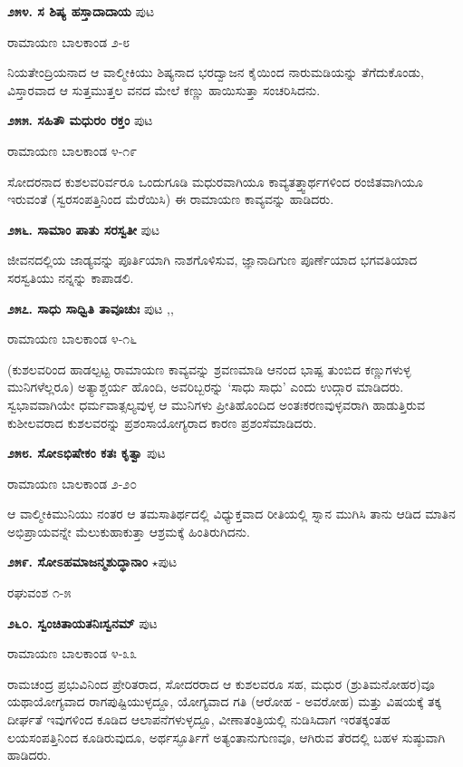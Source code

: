 {\medskip
\noindent\textbf{೨೫೪. ಸ ಶಿಷ್ಯ ಹಸ್ತಾದಾದಾಯ} \hfill ಪುಟ \pageref{198}

\hfill ರಾಮಾಯಣ ಬಾಲಕಾಂಡ ೨-೮

ನಿಯತೇಂದ್ರಿಯನಾದ ಆ ವಾಲ್ಮೀಕಿಯು ಶಿಷ್ಯನಾದ ಭರದ್ವಾಜನ ಕೈಯಿಂದ ನಾರುಮಡಿಯನ್ನು ತೆಗೆದುಕೊಂಡು, ವಿಸ್ತಾರವಾದ ಆ ಸುತ್ತಮುತ್ತಲ ವನದ ಮೇಲೆ ಕಣ್ಣು ಹಾಯಿಸುತ್ತಾ ಸಂಚರಿಸಿದನು.

\medskip
\noindent\textbf{೨೫೫. ಸಹಿತೌ ಮಧುರಂ ರಕ್ತಂ} \hfill ಪುಟ \pageref{189}

\hfill ರಾಮಾಯಣ ಬಾಲಕಾಂಡ ೪-೧೯

ಸೋದರನಾದ ಕುಶಲವರಿರ್ವರೂ ಒಂದುಗೂಡಿ ಮಧುರವಾಗಿಯೂ ಕಾವ್ಯತತ್ತ್ವಾರ್ಥಗಳಿಂದ ರಂಜಿತವಾಗಿಯೂ ಇರುವಂತೆ (ಸ್ವರಸಂಪತ್ತಿನಿಂದ ಮೆರೆಯಿಸಿ) ಈ ರಾಮಾಯಣ ಕಾವ್ಯವನ್ನು ಹಾಡಿದರು.

\medskip
\noindent\textbf{೨೫೬. ಸಾಮಾಂ ಪಾತು ಸರಸ್ವತೀ} \hfill ಪುಟ \pageref{100}

\hfill ಜೀವನದಲ್ಲಿಯ ಜಾಡ್ಯವನ್ನು ಪೂರ್ತಿಯಾಗಿ ನಾಶಗೊಳಿಸುವ, ಜ್ಞಾನಾದಿಗುಣ ಪೂರ್ಣೆಯಾದ ಭಗವತಿಯಾದ ಸರಸ್ವತಿಯು ನನ್ನನ್ನು ಕಾಪಾಡಲಿ.

\medskip
\noindent\textbf{೨೫೭. ಸಾಧು ಸಾಧ್ವಿತಿ ತಾವೂಚುಃ} \hfill ಪುಟ \pageref{168},\pageref{211},\pageref{242}

\hfill ರಾಮಾಯಣ ಬಾಲಕಾಂಡ ೪-೧೬

(ಕುಶಲವರಿಂದ ಹಾಡಲ್ಪಟ್ಟ ರಾಮಾಯಣ ಕಾವ್ಯವನ್ನು ಶ್ರವಣಮಾಡಿ ಆನಂದ ಭಾಷ್ಪ ತುಂಬಿದ ಕಣ್ಣುಗಳುಳ್ಳ ಮುನಿಗಳೆಲ್ಲರೂ) ಅತ್ಯಾಶ್ಚರ್ಯ ಹೊಂದಿ, ಅವರಿಬ್ಬರನ್ನು `ಸಾಧು ಸಾಧು' ಎಂದು ಉದ್ಗಾರ ಮಾಡಿದರು. ಸ್ವಭಾವವಾಗಿಯೇ ಧರ್ಮವಾತ್ಸಲ್ಯವುಳ್ಳ ಆ ಮುನಿಗಳು ಪ್ರೀತಿಹೊಂದಿದ ಅಂತಃಕರಣವುಳ್ಳವರಾಗಿ ಹಾಡುತ್ತಿರುವ ಕುಶೀಲವರಾದ ಕುಶಲವರನ್ನು ಪ್ರಶಂಸಾಯೋಗ್ಯರಾದ ಕಾರಣ ಪ್ರಶಂಸೆಮಾಡಿದರು.

\medskip
\noindent\textbf{೨೫೮. ಸೋಽಭಿಷೇಕಂ ಕತಃ ಕೃತ್ವಾ} \hfill ಪುಟ \pageref{201}

\hfill ರಾಮಾಯಣ ಬಾಲಕಾಂಡ ೨-೨೦

ಆ ವಾಲ್ಮೀಕಿಮುನಿಯು ನಂತರ ಆ ತಮಸಾತಿರ್ಥದಲ್ಲಿ ವಿಧ್ಯುಕ್ತವಾದ ರೀತಿಯಲ್ಲಿ ಸ್ನಾನ ಮುಗಿಸಿ ತಾನು ಆಡಿದ ಮಾತಿನ ಅಭಿಪ್ರಾಯವನ್ನೇ ಮೆಲುಕುಹಾಕುತ್ತಾ ಆಶ್ರಮಕ್ಕೆ ಹಿಂತಿರುಗಿದನು.

\medskip
\noindent\textbf{೨೫೯. ಸೋಽಹಮಾಜನ್ಮಶುದ್ಧಾನಾಂ} $\star$\hfill ಪುಟ \pageref{148}

\hfill ರಘುವಂಶ ೧-೫

\medskip
\noindent\textbf{೨೬೦. ಸ್ವಂಚಿತಾಯತನಿಃಸ್ವನಮ್} \hfill ಪುಟ \pageref{250}

\hfill ರಾಮಾಯಣ ಬಾಲಕಾಂಡ ೪-೩೩

ರಾಮಚಂದ್ರ ಪ್ರಭುವಿನಿಂದ ಪ್ರೇರಿತರಾದ, ಸೋದರರಾದ ಆ ಕುಶಲವರೂ ಸಹ, ಮಧುರ (ಶ್ರುತಿಮನೋಹರ)ವೂ ಯಥಾಯೋಗ್ಯವಾದ ರಾಗಪುಷ್ಟಿಯುಳ್ಳದ್ದೂ, ಯೋಗ್ಯವಾದ ಗತಿ (ಆರೋಹ - ಅವರೋಹ) ಮತ್ತು ವಿಷಯಕ್ಕೆ ತಕ್ಕ ದೀರ್ಘತೆ ಇವುಗಳಿಂದ ಕೂಡಿದ ಆಲಾಪನೆಗಳುಳ್ಳದ್ದೂ, ವೀಣಾತಂತ್ರಿಯಲ್ಲಿ ನುಡಿಸಿದಾಗ ಇರತಕ್ಕಂತಹ ಲಯಸಂಪತ್ತಿನಿಂದ ಕೂಡಿರುವುದೂ, ಅರ್ಥಸ್ಫೂರ್ತಿಗೆ ಅತ್ಯಂತಾನುಗುಣವೂ, ಆಗಿರುವ ತೆರದಲ್ಲಿ ಬಹಳ ಸುಷ್ಠುವಾಗಿ ಹಾಡಿದರು.

}
